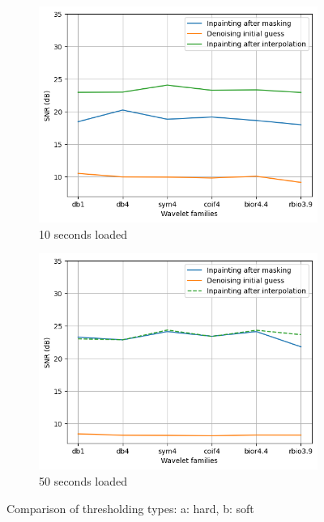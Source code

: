 \documentclass[a4paper]{article}
\begin{document}
\begin{figure}[H]
	\centering %
	\begin{subfigure}{0.4\textwidth}
		\includegraphics[width=\linewidth]{Images/Hardthresholding_letterO.png}
		\caption{10 seconds loaded}
		\label{fig:1}
	\end{subfigure}\hfil %
	\begin{subfigure}{0.4\textwidth}
		\includegraphics[width=\linewidth]{Images/Softthresholding_letterO.png}
		\caption{50 seconds loaded}
		\label{fig:2}
	\end{subfigure}\hfil
	\caption{Comparison of thresholding types: a: hard, b: soft}
	\label{softhardinpainting}
\end{figure}
\end{document}
